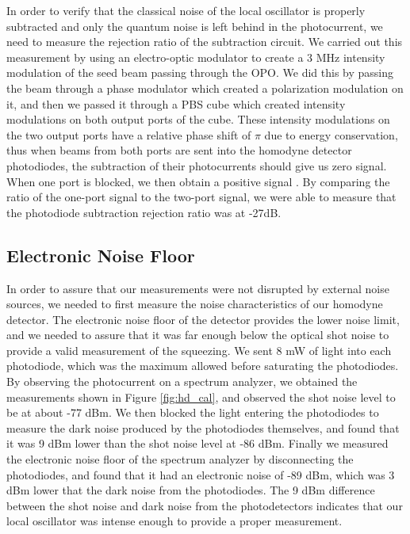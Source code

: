 In order to verify that the classical noise of the local oscillator is properly subtracted and only the quantum noise is left behind in the photocurrent, we need to measure the rejection ratio of the subtraction circuit.  We carried out this measurement by using an electro-optic modulator to create a 3 MHz intensity modulation of the seed beam passing through the OPO.  We did this by passing the beam through a phase modulator which created a polarization modulation on it, and then we passed it through a PBS cube which created intensity modulations on both output ports of the cube.  These intensity modulations on the two output ports have a relative phase shift of $\pi$ due to energy conservation, thus when beams from both ports are sent into the homodyne detector photodiodes, the subtraction of their photocurrents should give us zero signal.  When one port is blocked, we then obtain a positive signal .  By comparing the ratio  of the one-port signal to the two-port signal, we were able to measure that the photodiode subtraction rejection ratio was at -27dB. 
   




\subsection{Electronic Noise Floor} 
\label{electronic_noise_floor} 

In order to assure that our measurements were not disrupted by external noise sources, we needed to first measure the noise characteristics of our homodyne detector.  The electronic noise floor of the detector provides the lower noise limit, and we needed to assure that it was far enough below the optical shot noise to provide a valid measurement of the squeezing.  We sent 8 mW of light into each photodiode, which was the maximum allowed before saturating the photodiodes.  By observing the photocurrent on a spectrum analyzer, we obtained the measurements shown in Figure \ref{fig:hd_cal}, and observed the shot noise level to be at about -77 dBm.  We then blocked the light entering the photodiodes to measure the dark noise produced by the photodiodes themselves, and found that it was 9 dBm lower than the shot noise level at -86 dBm.  Finally we measured the electronic noise floor of the spectrum analyzer by disconnecting the photodiodes, and found that it had an electronic noise of -89 dBm, which was 3 dBm lower that the dark noise from the photodiodes.  The 9 dBm difference between the shot noise and dark noise from the photodetectors indicates that our local oscillator was intense enough to provide a proper measurement.

